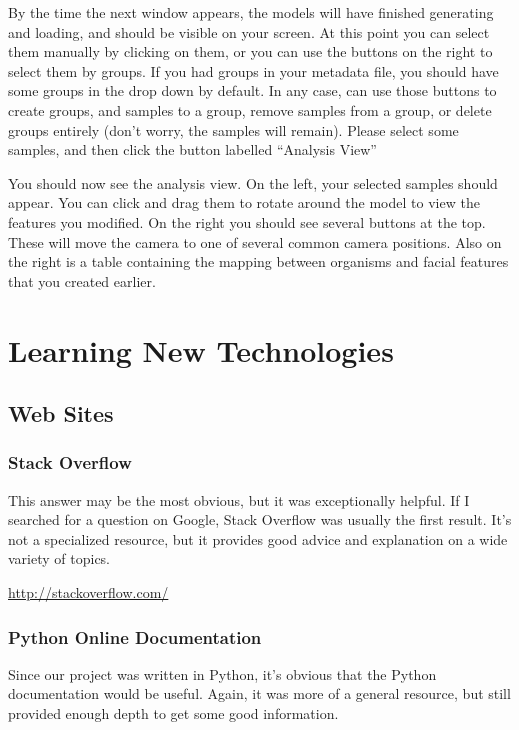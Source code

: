\documentclass[letterpaper,10pt, onecolumn, draftclsnofoot]{IEEEtran}
\begin{document}
By the time the next window appears, the models will have finished generating and loading, and should be visible on your screen. At this point you can select them manually by clicking on them, or you can use the buttons on the right to select them by groups. If you had groups in your metadata file, you should have some groups in the drop down by default. In any case, can use those buttons to create groups, and samples to a group, remove samples from a group, or delete groups entirely (don't worry, the samples will remain). Please select some samples, and then click the button labelled ``Analysis View''

You should now see the analysis view. On the left, your selected samples should appear. You can click and drag them to rotate around the model to view the features you modified. On the right you should see several buttons at the top. These will move the camera to one of several common camera positions. Also on the right is a table containing the mapping between organisms and facial features that you created earlier.

\section{Learning New Technologies}

\subsection{Web Sites}

\subsubsection{Stack Overflow}
This answer may be the most obvious, but it was exceptionally helpful. If I searched for a question on Google, Stack Overflow was usually the first result. It's not a specialized resource, but it provides good advice and explanation on a wide variety of topics.

\url{http://stackoverflow.com/}

\subsubsection{Python Online Documentation}

Since our project was written in Python, it's obvious that the Python documentation would be useful. Again, it was more of a general resource, but still provided enough depth to get some good information.
\end{document}
